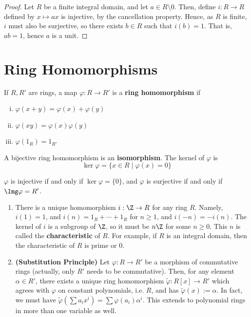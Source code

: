 \begin{proof}
    Let $R$ be a finite integral domain, and let $a \in R \setminus 0$. Then, define $i:R \to R$ defined by $x \mapsto ax$ is injective, by the cancellation property. Hence, as $R$ is finite, $i$ must also be surjective, so there exists $b \in R$ such that $i(b)=1$. That is, $ab=1$, hence $a$ is a unit.
\end{proof}

\section{Ring Homomorphisms}

\begin{defn}
    If $R,R'$ are rings, a map $\varphi :R \to R'$ is a \textbf{ring homomorphism} if
    \begin{enumerate}[(i)]
        \item $\varphi(x+y) = \varphi(x)+\varphi(y)$
        \item $\varphi(xy)=\varphi(x)\varphi(y)$
        \item $\varphi(1_R)=1_{R'}$
    \end{enumerate}
    A bijective ring homomorphism is an \textbf{isomorphism}. The kernel of $\varphi$ is
    $$\ker \varphi = \{x \in R \mid \varphi (x)=0\}$$
\end{defn}

\begin{prop}
    $\varphi$ is injective if and only if $\ker \varphi = \{0\}$, and $\varphi$ is surjective if and only if $\Img \varphi = R'$.
\end{prop}

\begin{ex}
    \begin{enumerate}
        \item There is a unique homomorphism $i:\Z \to R$ for any ring $R$. Namely, $i(1)=1$, and $i(n)= 1_R+\cdots +1_R$ for $n \geq 1$, and $i(-n)=-i(n)$. The kernel of $i$ is a subgroup of $\Z$, so it must be $n\Z$ for some $n \geq 0$. This $n$ is called the \textbf{characteristic} of $R$. For example, if $R$ is an integral domain, then the characteristic of $R$ is prime or $0$.
        \item \textbf{(Substitution Principle)} Let $\varphi:R \to R'$ be a morphism of commutative rings (actually, only $R'$ needs to be commutative). Then, for any element $\alpha \in R'$, there exists a unique ring homomorphism $\tilde \varphi:R[x] \to R'$ which agrees with $\varphi$ on constant polynomials, i.e. $R$, and has $\tilde \varphi (x) := \alpha$. In fact, we must have $\tilde \varphi(\sum a_ix^i)=\sum\varphi(a_i) \alpha ^i$. This extends to polynomial rings in more than one variable as well.
    \end{enumerate}
\end{ex}

